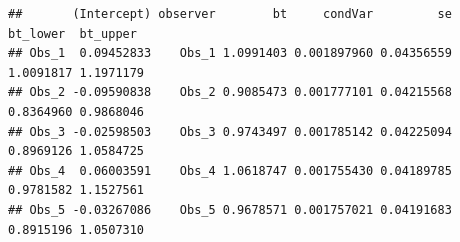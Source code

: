 \documentclass[
]{article}
\newenvironment{Shaded}{\begin{snugshade}}{\end{snugshade}}
\newcommand{\AttributeTok}[1]{\textcolor[rgb]{0.13,0.29,0.53}{#1}}
\newcommand{\CommentTok}[1]{\textcolor[rgb]{0.56,0.35,0.01}{\textit{#1}}}
\newcommand{\DecValTok}[1]{\textcolor[rgb]{0.00,0.00,0.81}{#1}}
\newcommand{\FloatTok}[1]{\textcolor[rgb]{0.00,0.00,0.81}{#1}}
\newcommand{\FunctionTok}[1]{\textcolor[rgb]{0.13,0.29,0.53}{\textbf{#1}}}
\newcommand{\NormalTok}[1]{#1}
\newcommand{\OtherTok}[1]{\textcolor[rgb]{0.56,0.35,0.01}{#1}}
\newcommand{\SpecialCharTok}[1]{\textcolor[rgb]{0.81,0.36,0.00}{\textbf{#1}}}
\newcommand{\StringTok}[1]{\textcolor[rgb]{0.31,0.60,0.02}{#1}}
\begin{document}
\begin{Shaded}
\end{Shaded}

\begin{verbatim}
##       (Intercept) observer        bt     condVar         se  bt_lower  bt_upper
## Obs_1  0.09452833    Obs_1 1.0991403 0.001897960 0.04356559 1.0091817 1.1971179
## Obs_2 -0.09590838    Obs_2 0.9085473 0.001777101 0.04215568 0.8364960 0.9868046
## Obs_3 -0.02598503    Obs_3 0.9743497 0.001785142 0.04225094 0.8969126 1.0584725
## Obs_4  0.06003591    Obs_4 1.0618747 0.001755430 0.04189785 0.9781582 1.1527561
## Obs_5 -0.03267086    Obs_5 0.9678571 0.001757021 0.04191683 0.8915196 1.0507310
\end{verbatim}
\end{document}

